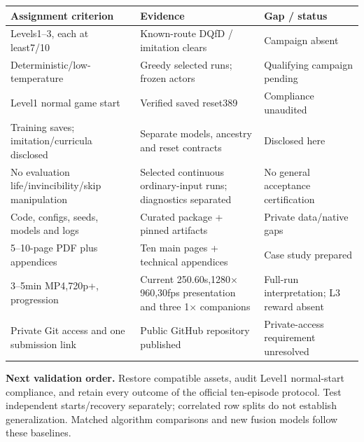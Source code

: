 \documentclass[11pt,a4paper]{article}
\begin{document}
\begin{tabularx}{\linewidth}{@{}P{44mm}Y P{32mm}@{}}\toprule
Assignment criterion & Evidence & Gap / status\\\midrule
Levels1--3, each at least7/10 & Known-route DQfD / imitation clears & Campaign absent\\
Deterministic/low-temperature & Greedy selected runs; frozen actors & Qualifying campaign pending\\
Level1 normal game start & Verified saved reset389 & Compliance unaudited\\
Training saves; imitation/curricula disclosed & Separate models, ancestry and reset contracts & Disclosed here\\
No evaluation life/invincibility/skip manipulation & Selected continuous ordinary-input runs; diagnostics separated & No general acceptance certification\\
Code, configs, seeds, models and logs & Curated package + pinned artifacts & Private data/native gaps\\
5--10-page PDF plus appendices & Ten main pages + technical appendices & Case study prepared\\
3--5min MP4,720p+, progression & Current 250.60s,1280$\times$960,30fps presentation and three 1$\times$ companions & Full-run interpretation; L3 reward absent\\
Private Git access and one submission link & Public GitHub repository published & Private-access requirement unresolved\\\bottomrule
\end{tabularx}

\textbf{Next validation order.} Restore compatible assets, audit Level1 normal-start compliance, and retain every outcome of the official ten-episode protocol. Test independent starts/recovery separately; correlated row splits do not establish generalization. Matched algorithm comparisons and new fusion models follow these baselines.
\end{document}
